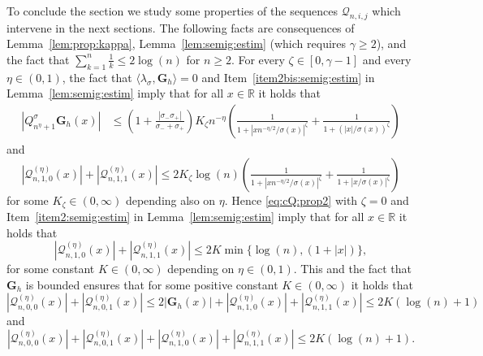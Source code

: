 \documentclass[12pt]{article}
\numberwithin{equation}{section}
\theoremstyle{definition}
\theoremstyle{remark}
\newcommand{\RR}{\mathbb{R}}
\newcommand{\cQ}{\mathcal{Q}}
\newcommand{\bfG}[1]{\mathbf{G}_{#1}}
\begin{document}
To conclude the section we study some properties of the sequences $\cQ_{n,i,j}$ which intervene in the next sections.
%
%
The following facts are consequences of Lemma~\ref{lem:prop:kappa}, Lemma~\ref{lem:semig:estim} (which requires $\gamma \geq 2$), and the fact that $\sum_{k=1}^{n} \frac1k \leq 2 \log(n)$ for $n \geq 2$.
%
For every $\zeta\in [0,\gamma-1]$ and every $\eta \in (0,1)$, the fact that  $\langle \lambda_\sigma , \bfG{h} \rangle=0$ and Item~\ref{item2bis:semig:estim} in Lemma~\ref{lem:semig:estim} imply that for all $x\in \RR$ it holds that
\begin{equation} \label{eq:cQ:prop1}
\begin{split}
	|Q^\sigma_{n^{\eta}+1} \bfG{h} (x) | 
	& \leq  \left(1+\tfrac{|\sigma_-\sigma_+|}{\sigma_-+\sigma_+}\right)  K_\zeta n^{-\eta} \left(\tfrac1{1+|x n^{-\eta/2}/\sigma(x)|^\zeta} + \tfrac1{1+(|x|/\sigma(x))^\zeta}\right)
\end{split}
\end{equation}
and
\begin{equation} \label{eq:cQ:prop2}
	|\cQ^{(\eta)}_{n,1,0}(x)|+|\cQ^{(\eta)}_{n,1,1}(x)| \leq 2 K_\zeta \log(n) \left(\tfrac1{1+|x n^{-{\eta}/2}/\sigma(x)|^\zeta} + \tfrac1{1+|x/\sigma(x)|^\zeta}\right)
\end{equation}
for some $K_\zeta\in (0,\infty)$ depending also on $\eta$.
Hence \eqref{eq:cQ:prop2} with $\zeta=0$ and Item~\ref{item2:semig:estim} in Lemma~\ref{lem:semig:estim} imply that for all $x\in \RR$ it holds that
\begin{equation} \label{eq:cQ:prop3}
	|\cQ^{(\eta)}_{n,1,0}(x)|+|\cQ^{(\eta)}_{n,1,1}(x)| \leq 2 K \min{\{ \log(n) ,(1+|x|) \}},
\end{equation}
for some constant $K\in (0,\infty)$ depending on $\eta \in (0,1)$.
This and the fact that $\bfG{h}$ is bounded ensures that for some positive constant $K\in (0,\infty)$ it holds that
$
	|\cQ^{(\eta)}_{n,0,0}(x)|+|\cQ^{(\eta)}_{n,0,1}(x)| \leq 2 |\bfG{h}(x)| + |\cQ^{(\eta)}_{n,1,0}(x)|+|\cQ^{(\eta)}_{n,1,1}(x)| \leq 2 K (\log(n) +1)
$
and 
\begin{equation} \label{eq:cQ:prop4}
	|\cQ^{(\eta)}_{n,0,0}(x)|+|\cQ^{(\eta)}_{n,0,1}(x)| + |\cQ^{(\eta)}_{n,1,0}(x)|+|\cQ^{(\eta)}_{n,1,1}(x)| \leq 2 K ( \log(n) +1).
\end{equation}
\end{document}
